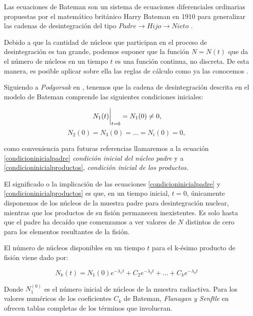 \noindent Las ecuaciones de Bateman son un sistema de ecuaciones diferenciales ordinarias propuestas por el matemático británico Harry Bateman en 1910 para generalizar las cadenas de desintegración del tipo $Padre\rightarrow Hijo \rightarrow Nieto$ \cite{Podgorsak.2016}.

\noindent Debido a que la cantidad de núcleos que participan en el proceso de desintegración es tan grande, podemos suponer que la función $N=N(t)$ que da el número de núcleos en un tiempo $t$ es una función continua, no discreta. De esta manera, es posible aplicar sobre ella las reglas de cálculo como ya las conocemos \cite{Podgorsak.2016}. 

\noindent Siguiendo a \textit{Podgorsak} en \cite{Podgorsak.2016}, tenemos que la cadena de desintegración descrita en el modelo de Bateman comprende las siguientes condiciones iniciales:

\begin{equation}
    \eval{N_1(t)}_{t=0}=N_1(0)\neq 0,\label{condicioninicialpadre}
\end{equation}
\begin{equation}
    N_2(0)=N_3(0)=...=N_i(0)=0, \label{condicioninicialproductos}
\end{equation}

\noindent como conveniencia para futuras referencias llamaremos a la ecuación \ref{condicioninicialpadre} \textit{condición inicial del núcleo padre} y a \ref{condicioninicialproductos}, \textit{condición inicial de los productos}. 

El significado o la implicación de las ecuaciones \ref{condicioninicialpadre} y \ref{condicioninicialproductos} es que, en un tiempo inicial, $t=0$, únicamente disponemos de los núcleos de la muestra padre para desintegración nuclear, mientras que los productos de su fisión permanecen inexistentes. Es solo hasta que el padre ha decaído que comenzamos a ver valores de $N$ distintos de cero para los elementos resultantes de la fisión. 

El número de núcleos disponibles en un tiempo $t$ para el k-ésimo producto de fisión viene dado por:

\begin{equation}
        N_k(t)=N_1(0) e^{-\lambda_1 t}+C_2 e^{-\lambda_2 t}+...+C_k e^{-\lambda_k t} \label{iesimonucleo}
\end{equation}

\noindent Donde $N_1^{(0)}$ es el número inicial de núcleos de la muestra radiactiva. Para los valores numéricos de los coeficientes $C_k$ de Bateman, \textit{Flanagan y Senftle} en \cite{Flanagan1954} ofrecen tablas completas de los términos que involucran.

